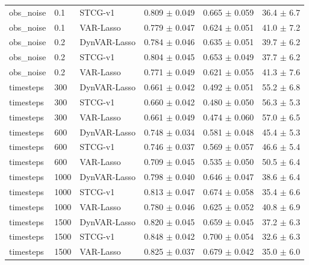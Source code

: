 \begin{tabular}{lllrrr}
obs_noise & 0.1 & STCG-v1 & 0.809 $\pm$ 0.049 & 0.665 $\pm$ 0.059 & 36.4 $\pm$ 6.7 \\
obs_noise & 0.1 & VAR-Lasso & 0.779 $\pm$ 0.047 & 0.624 $\pm$ 0.051 & 41.0 $\pm$ 7.2 \\
obs_noise & 0.2 & DynVAR-Lasso & 0.784 $\pm$ 0.046 & 0.635 $\pm$ 0.051 & 39.7 $\pm$ 6.2 \\
obs_noise & 0.2 & STCG-v1 & 0.804 $\pm$ 0.045 & 0.653 $\pm$ 0.049 & 37.7 $\pm$ 6.2 \\
obs_noise & 0.2 & VAR-Lasso & 0.771 $\pm$ 0.049 & 0.621 $\pm$ 0.055 & 41.3 $\pm$ 7.6 \\
timesteps & 300 & DynVAR-Lasso & 0.661 $\pm$ 0.042 & 0.492 $\pm$ 0.051 & 55.2 $\pm$ 6.8 \\
timesteps & 300 & STCG-v1 & 0.660 $\pm$ 0.042 & 0.480 $\pm$ 0.050 & 56.3 $\pm$ 5.3 \\
timesteps & 300 & VAR-Lasso & 0.661 $\pm$ 0.049 & 0.474 $\pm$ 0.060 & 57.0 $\pm$ 6.5 \\
timesteps & 600 & DynVAR-Lasso & 0.748 $\pm$ 0.034 & 0.581 $\pm$ 0.048 & 45.4 $\pm$ 5.3 \\
timesteps & 600 & STCG-v1 & 0.746 $\pm$ 0.037 & 0.569 $\pm$ 0.057 & 46.6 $\pm$ 5.4 \\
timesteps & 600 & VAR-Lasso & 0.709 $\pm$ 0.045 & 0.535 $\pm$ 0.050 & 50.5 $\pm$ 6.4 \\
timesteps & 1000 & DynVAR-Lasso & 0.798 $\pm$ 0.040 & 0.646 $\pm$ 0.047 & 38.6 $\pm$ 6.4 \\
timesteps & 1000 & STCG-v1 & 0.813 $\pm$ 0.047 & 0.674 $\pm$ 0.058 & 35.4 $\pm$ 6.6 \\
timesteps & 1000 & VAR-Lasso & 0.780 $\pm$ 0.046 & 0.625 $\pm$ 0.052 & 40.8 $\pm$ 6.9 \\
timesteps & 1500 & DynVAR-Lasso & 0.820 $\pm$ 0.045 & 0.659 $\pm$ 0.045 & 37.2 $\pm$ 6.3 \\
timesteps & 1500 & STCG-v1 & 0.848 $\pm$ 0.042 & 0.700 $\pm$ 0.054 & 32.6 $\pm$ 6.3 \\
timesteps & 1500 & VAR-Lasso & 0.825 $\pm$ 0.037 & 0.679 $\pm$ 0.042 & 35.0 $\pm$ 6.0 \\
\bottomrule
\end{tabular}
